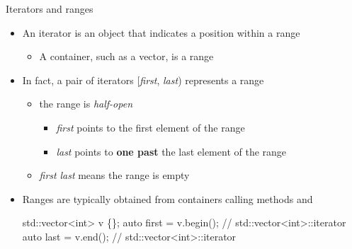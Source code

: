 \begin{frame}[fragile]{Iterators and ranges}
  \begin{itemize}
  \item An \alert{iterator} is an object that indicates a position within a
    \alert{range}
    \begin{itemize}
    \item A container, such as a vector, is a range
    \end{itemize}
  \item<2-> In fact, a pair of iterators [\textit{first}, \textit{last})
    represents a range
    \begin{itemize}
    \item the range is \textit{half-open}
      \begin{itemize}
      \item \textit{first} points to the first element of the range
      \item \textit{last} points to \textbf{one past} the last element of the
        range
      \end{itemize}
    \item \textit{first} \code{==} \textit{last} means the range is empty
    \end{itemize}


  \item<3-> Ranges are typically obtained from containers calling methods
     and 
    \begin{codeblock}
std::vector<int> v \{\ddd\};
auto first = v.begin(); // std::vector<int>::iterator
auto last  = v.end();   // std::vector<int>::iterator\end{codeblock}
  \end{itemize}

\end{frame}


